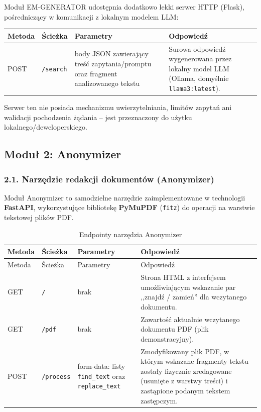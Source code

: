 Moduł EM-GENERATOR udostępnia dodatkowo lekki serwer HTTP (Flask), pośredniczący w komunikacji z lokalnym modelem LLM:

\begin{longtable}{p{} p{} p{} p{}}
\toprule
\rowcolor{tablehead!15}
Metoda & Ścieżka & Parametry & Odpowiedź \\
\midrule
\endhead
POST & \texttt{/search} & body JSON zawierający treść zapytania/promptu oraz fragment analizowanego tekstu & Surowa odpowiedź wygenerowana przez lokalny model LLM (Ollama, domyślnie \texttt{llama3:latest}). \\
\bottomrule
\end{longtable}

Serwer ten nie posiada mechanizmu uwierzytelniania, limitów zapytań ani walidacji pochodzenia żądania -- jest przeznaczony do użytku lokalnego/deweloperskiego.

\subsection*{Moduł 2: Anonymizer}

\subsubsection*{2.1. Narzędzie redakcji dokumentów (Anonymizer)}

Moduł Anonymizer to samodzielne narzędzie zaimplementowane w technologii \textbf{FastAPI}, wykorzystujące bibliotekę \textbf{PyMuPDF} (\texttt{fitz}) do operacji na warstwie tekstowej plików PDF.

\begin{longtable}{p{} p{} p{} p{}}
\caption{Endpointy narzędzia Anonymizer} \\
\toprule
\rowcolor{tablehead!15}
Metoda & Ścieżka & Parametry & Odpowiedź \\
\midrule
\endfirsthead
\toprule
\rowcolor{tablehead!15}
Metoda & Ścieżka & Parametry & Odpowiedź \\
\midrule
\endhead
GET & \texttt{/} & brak & Strona HTML z interfejsem umożliwiającym wskazanie par ,,znajdź / zamień'' dla wczytanego dokumentu. \\
GET & \texttt{/pdf} & brak & Zawartość aktualnie wczytanego dokumentu PDF (plik demonstracyjny). \\
POST & \texttt{/process} & form-data: listy \texttt{find\_text} oraz \texttt{replace\_text} & Zmodyfikowany plik PDF, w którym wskazane fragmenty tekstu zostały fizycznie zredagowane (usunięte z warstwy treści) i zastąpione podanym tekstem zastępczym. \\
\bottomrule
\end{longtable}


